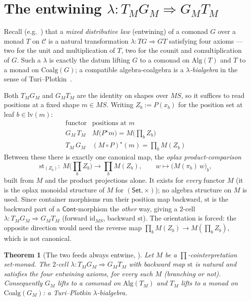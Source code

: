 \documentclass[11pt]{article}
\theoremstyle{plain}
\newtheorem{theorem}{Theorem}
\theoremstyle{definition}
\theoremstyle{remark}
\newcommand{\Set}{\mathsf{Set}}
\newcommand{\Cont}{\mathsf{Cont}}
\newcommand{\Alg}{\mathrm{Alg}}
\newcommand{\Coalg}{\mathrm{Coalg}}
\newcommand{\id}{\mathrm{id}}
\newcommand{\str}{\mathrm{st}}
\newcommand{\lv}{\mathrm{lv}}
\begin{document}
\section{The entwining $\lambda\colon T_M G_M\Rightarrow G_M T_M$}\label{sec:lambda}

Recall (e.g.~\cite{PowerWatanabe02}) that a \emph{mixed distributive law} (entwining)
of a comonad $G$ over a monad $T$ on $\mathcal C$ is a natural transformation
$\lambda\colon TG\Rightarrow GT$ satisfying four axioms --- two for the unit and
multiplication of $T$, two for the counit and comultiplication of $G$. Such a
$\lambda$ is exactly the datum lifting $G$ to a comonad on $\Alg(T)$ and $T$ to a monad
on $\Coalg(G)$; a compatible algebra-coalgebra is a \emph{$\lambda$-bialgebra} in the
sense of Turi--Plotkin~\cite{TuriPlotkin97}.

Both $T_M G_M$ and $G_M T_M$ are the identity on shapes over $MS$, so it suffices to
read positions at a fixed shape $m\in MS$. Writing $Z_b:=P(x_b)$ for the position set at
leaf $b\in\lv(m)$:
\[
  \renewcommand{\arraystretch}{1.4}
  \begin{array}{c|c}
    \text{functor} & \text{positions at }m\\\hline
    G_M\,T_M & M\bigl(P^\star m\bigr)=M\bigl(\textstyle\prod_b Z_b\bigr)\\
    T_M\,G_M & (M\circ P)^\star(m)=\textstyle\prod_b M(Z_b)
  \end{array}
\]
Between these there is exactly one canonical map, the \emph{oplax product-comparison}
\[
  \str_{(Z_b)}\colon\ M\bigl(\textstyle\prod_b Z_b\bigr)\longrightarrow\prod_b M(Z_b),
  \qquad w\longmapsto\bigl(M(\pi_b)\,w\bigr)_b,
\]
built from $M$ and the product projections alone. It exists for \emph{every} functor
$M$ (it is the oplax monoidal structure of $M$ for $(\Set,\times)$); no algebra
structure on $M$ is used. Since container morphisms run their position map backward,
$\str$ is the backward part of a $\Cont$-morphism the \emph{other} way, giving a
$2$-cell $\lambda\colon T_M G_M\Rightarrow G_M T_M$ (forward $\id_{MS}$, backward
$\str$). The orientation is forced: the opposite direction would need the reverse map
$\prod_b M(Z_b)\to M(\prod_b Z_b)$, which is not canonical.

\begin{theorem}[The two feeds always entwine, {\cite[monad--comonad entwining note]{MacBethEntwine}}]
\label{thm:lambda}
Let $M$ be a $\prod$-cointerpretation set-monad. The $2$-cell
$\lambda\colon T_M G_M\Rightarrow G_M T_M$ with backward map $\str$ is natural and
satisfies the four entwining axioms, for \emph{every} such $M$ (branching or not).
Consequently $G_M$ lifts to a comonad on $\Alg(T_M)$ and $T_M$ lifts to a monad on
$\Coalg(G_M)$: a Turi--Plotkin $\lambda$-bialgebra.
\end{theorem}
\end{document}
